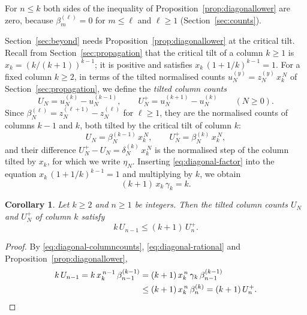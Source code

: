 \documentclass{amsart}
\newtheorem{corollary}[theorem]{Corollary}
\theoremstyle{definition}
\theoremstyle{remark}
\numberwithin{equation}{section}
\begin{document}
For $n\le k$ both sides of the inequality of
Proposition~\ref{prop:diagonallower} are zero, because
$\beta^{(\ell)}_m=0$ for $m\le\ell$ and $\ell\ge1$
(Section~\ref{sec:counts}).

Section~\ref{sec:beyond} needs Proposition~\ref{prop:diagonallower} at the
critical tilt. Recall from Section~\ref{sec:propagation} that the critical
tilt of a column $k\ge1$ is $x_k=(k/(k+1))^{k-1}$; it is positive and
satisfies $x_k\,(1+1/k)^{k-1}=1$. For a fixed column $k\ge2$, in terms of
the tilted normalised counts $u^{(y)}_N=z^{(y)}_N\,x_k^{\,N}$ of
Section~\ref{sec:propagation}, we define the
\emph{tilted column counts}
\[
U_N=u^{(k)}_N-u^{(k-1)}_N,\qquad U^{+}_N=u^{(k+1)}_N-u^{(k)}_N
\qquad(N\ge0).
\]
Since $\beta^{(\ell)}_N=z^{(\ell+1)}_N-z^{(\ell)}_N$ for $\ell\ge1$, they are
the normalised counts of columns $k-1$ and $k$, both tilted by the
critical tilt of column $k$:
\begin{equation}\label{eq:diagonal-columncounts}
U_N=\beta^{(k-1)}_N\,x_k^{\,N},\qquad U^{+}_N=\beta^{(k)}_N\,x_k^{\,N},
\end{equation}
and their difference $U^{+}_N-U_N=\delta^{(k)}_N\,x_k^{\,N}$ is the
normalised step of the column tilted by $x_k$, for which we write $\eta_N$.
Inserting
\eqref{eq:diagonal-factor} into the equation $x_k\,(1+1/k)^{k-1}=1$ and
multiplying by $k$, we obtain
\begin{equation}\label{eq:diagonal-rational}
(k+1)\,x_k\,\gamma_k=k .
\end{equation}

\begin{corollary}\label{cor:diagonaltilted}
Let $k\ge2$ and $n\ge1$ be integers. Then the tilted column counts $U_N$ and
$U^{+}_N$ of column $k$ satisfy
\[
k\,U_{n-1}\le(k+1)\,U^{+}_n .
\]
\end{corollary}

\begin{proof}
By \eqref{eq:diagonal-columncounts}, \eqref{eq:diagonal-rational} and
Proposition~\ref{prop:diagonallower},
\begin{align*}
k\,U_{n-1}=k\,x_k^{\,n-1}\,\beta^{(k-1)}_{n-1}
&=(k+1)\,x_k^{\,n}\,\gamma_k\,\beta^{(k-1)}_{n-1}\\
&\le(k+1)\,x_k^{\,n}\,\beta^{(k)}_n=(k+1)\,U^{+}_n. \qedhere
\end{align*}
\end{proof}
\end{document}
